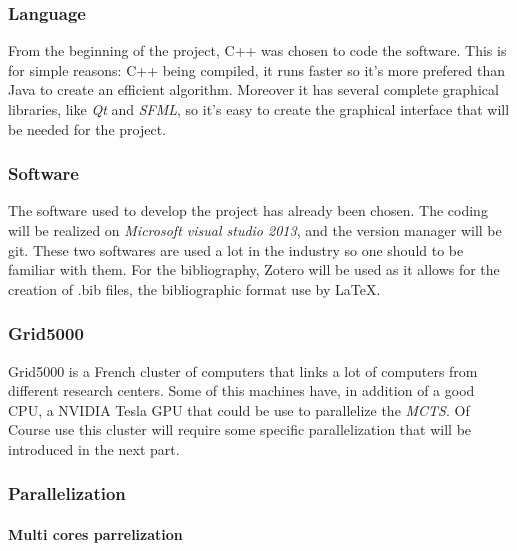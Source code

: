 \subsubsection{Language}

From the beginning of the project, C++ was chosen to code the software. This is for simple reasons: C++ being compiled, it runs faster so it's more prefered than Java to create an efficient algorithm.  Moreover it has several complete graphical libraries, like \emph{Qt} and \emph{SFML}, so it's easy to create the graphical interface that will be needed for the project.

\subsubsection{Software}

The software used to develop the project has already been chosen. The coding will be realized on \emph{Microsoft visual studio 2013}, and the version manager will be git. These two softwares are used a lot in the industry so one should to be familiar with them.
For the bibliography, Zotero will be used as it allows for the creation of .bib files, the bibliographic format use by LaTeX.

\subsubsection{Grid5000}

Grid5000 is a French cluster of computers that links a lot of computers from different research centers. Some of this machines have, in addition of a good CPU, a NVIDIA Tesla GPU that could be use to parallelize the \emph{MCTS}. Of Course use this cluster will require some specific parallelization that will be introduced in the next part.

\subsubsection{Parallelization}

\paragraph{Multi cores parrelization}\mbox{}\\\mbox{}\\

